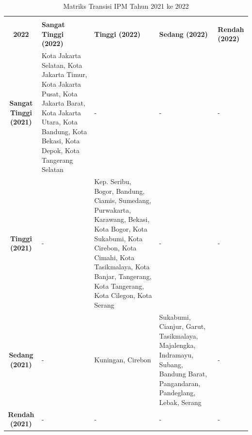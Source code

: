 \begin{table}[H]
\centering
\caption{Matriks Transisi IPM Tahun 2021 ke 2022} \label{tab:ipm_transisi_2021_2022}
\begin{tabular}{|c|p{2cm}|p{2cm}|p{2cm}|p{2cm}|}
\hline
\makecell{\textbf{Tahun 2021} \\ \textbf{2022}} & \textbf{Sangat Tinggi (2022)} & \textbf{Tinggi (2022)} & \textbf{Sedang (2022)} & \textbf{Rendah (2022)} \\ \hline
\textbf{Sangat Tinggi (2021)} & Kota Jakarta Selatan, Kota Jakarta Timur, Kota Jakarta Pusat, Kota Jakarta Barat, Kota Jakarta Utara, Kota Bandung, Kota Bekasi, Kota Depok, Kota Tangerang Selatan & - & - & - \\ \hline
\textbf{Tinggi (2021)} & - & Kep. Seribu, Bogor, Bandung, Ciamis, Sumedang, Purwakarta, Karawang, Bekasi, Kota Bogor, Kota Sukabumi, Kota Cirebon, Kota Cimahi, Kota Tasikmalaya, Kota Banjar, Tangerang, Kota Tangerang, Kota Cilegon, Kota Serang & - & - \\ \hline
\textbf{Sedang (2021)} & - & Kuningan, Cirebon & Sukabumi, Cianjur, Garut, Tasikmalaya, Majalengka, Indramayu, Subang, Bandung Barat, Pangandaran, Pandeglang, Lebak, Serang & - \\ \hline
\textbf{Rendah (2021)} & - & - & - & - \\ \hline
\end{tabular}
\end{table}